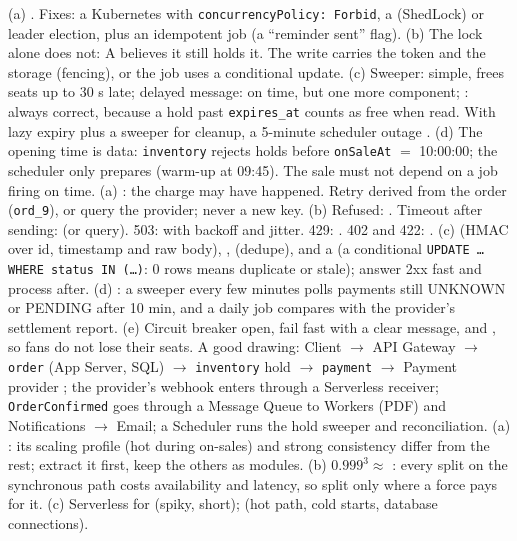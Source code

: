  (a) . Fixes: a Kubernetes  with \texttt{concurrencyPolicy: Forbid}, a  (ShedLock) or leader election, plus an idempotent job (a ``reminder sent'' flag). (b) The lock alone does not: A believes it still holds it. The write carries the token and the storage  (fencing), or the job uses a conditional update. (c) Sweeper: simple, frees seats up to 30 s late; delayed message: on time, but one more component; : always correct, because a hold past \texttt{expires\_at} counts as free when read. With lazy expiry plus a sweeper for cleanup, a 5-minute scheduler outage . (d) The opening time is data: \texttt{inventory} rejects holds before \texttt{onSaleAt} $=$ 10:00:00; the scheduler only prepares (warm-up at 09:45). The sale must not depend on a job firing on time.
 (a) : the charge may have happened. Retry  derived from the order (\texttt{ord\_9}), or query the provider; never a new key. (b) Refused: . Timeout after sending:  (or query). 503:  with backoff and jitter. 429: . 402 and 422: . (c)  (HMAC over id, timestamp and raw body), ,  (dedupe), and a  (a conditional \texttt{UPDATE \dots{} WHERE status IN (\dots)}: 0 rows means duplicate or stale); answer 2xx fast and process after. (d) : a sweeper every few minutes polls payments still UNKNOWN or PENDING after 10 min, and a daily job compares with the provider's settlement report. (e) Circuit breaker open, fail fast with a clear message, and , so fans do not lose their seats.
 A good drawing: Client $\to$ API Gateway $\to$ \texttt{order} (App Server, SQL)  $\to$ \texttt{inventory} hold  $\to$ \texttt{payment} $\to$ Payment provider ; the provider's webhook enters through a Serverless receiver; \texttt{OrderConfirmed} goes  through a Message Queue to Workers (PDF) and Notifications $\to$ Email; a Scheduler runs the hold sweeper and reconciliation. (a) : its scaling profile (hot during on-sales) and strong consistency differ from the rest; extract it first, keep the others as modules. (b) $0.999^3 \approx$ : every split on the synchronous path costs availability and latency, so split only where a force pays for it. (c) Serverless for  (spiky, short);  (hot path, cold starts, database connections).
